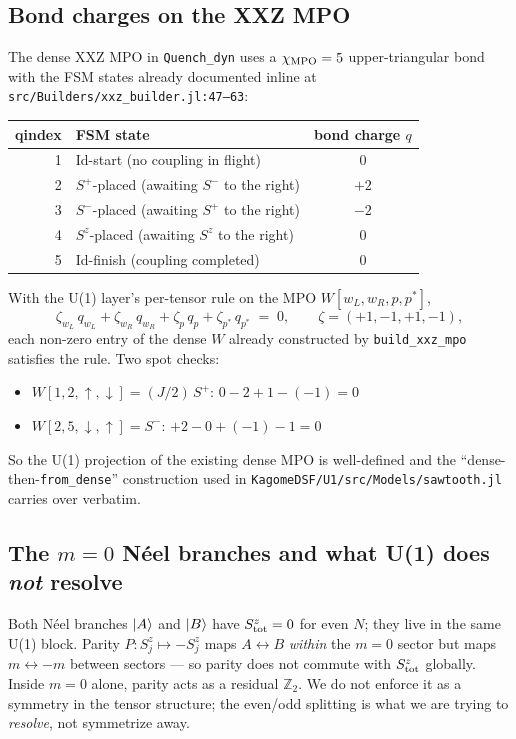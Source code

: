 \documentclass[11pt]{article}
\begin{document}
\subsection{Bond charges on the XXZ MPO}
The dense XXZ MPO in \texttt{Quench\_dyn} uses a $\chi_{\rm MPO}=5$
upper-triangular bond with the FSM states already documented inline at
\texttt{src/Builders/xxz\_builder.jl:47--63}:
\begin{center}
\begin{tabular}{rlc}
\toprule
qindex & FSM state & bond charge $q$ \\
\midrule
1 & Id-start \;(no coupling in flight)        & $0$ \\
2 & $S^+$-placed \;(awaiting $S^-$ to the right) & $+2$ \\
3 & $S^-$-placed \;(awaiting $S^+$ to the right) & $-2$ \\
4 & $S^z$-placed \;(awaiting $S^z$ to the right) & $0$ \\
5 & Id-finish \;(coupling completed)             & $0$ \\
\bottomrule
\end{tabular}
\end{center}
With the U(1) layer's per-tensor rule on the MPO
$W[w_L, w_R, p, p^*]$,
\[
  \zeta_{w_L}\,q_{w_L}
  + \zeta_{w_R}\,q_{w_R}
  + \zeta_{p}\,q_{p}
  + \zeta_{p^*}\,q_{p^*}
  \;=\; 0,
  \qquad \zeta = (+1,-1,+1,-1),
\]
each non-zero entry of the dense $W$ already constructed by
\texttt{build\_xxz\_mpo} satisfies the rule.  Two spot checks:
\begin{itemize}[leftmargin=2em]
  \item $W[1,2,\uparrow,\downarrow] = (J/2)\,S^+$:
        $0 - 2 + 1 - (-1) = 0$ \checkmark
  \item $W[2,5,\downarrow,\uparrow] = S^-$:
        $+2 - 0 + (-1) - 1 = 0$ \checkmark
\end{itemize}
So the U(1) projection of the existing dense MPO is well-defined and the
``dense-then-\texttt{from\_dense}'' construction used in
\texttt{KagomeDSF/U1/src/Models/sawtooth.jl} carries over verbatim.

\subsection{The $m=0$ N\'eel branches and what U(1) does \emph{not} resolve}
Both N\'eel branches $\ket{A}$ and $\ket{B}$ have $S^z_{\rm tot}=0$ for even $N$;
they live in the same U(1) block.  Parity $P: S^z_j \mapsto -S^z_j$ maps $A
\leftrightarrow B$ \emph{within} the $m=0$ sector but maps $m \leftrightarrow
-m$ between sectors --- so parity does not commute with $S^z_{\rm tot}$
globally.  Inside $m=0$ alone, parity acts as a residual $\mathbb{Z}_2$.  We
do not enforce it as a symmetry in the tensor structure; the even/odd
splitting is what we are trying to \emph{resolve}, not symmetrize away.
\end{document}
